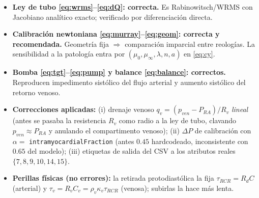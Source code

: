 \documentclass[11pt]{article}
\begin{document}
\begin{itemize}
\item \textbf{Ley de tubo \eqref{eq:wrms}--\eqref{eq:dQ}: correcta.} Es
  Rabinowitsch/WRMS con Jacobiano analítico exacto; verificado por
  diferenciación directa.
\item \textbf{Calibración newtoniana \eqref{eq:murray}--\eqref{eq:geom}:
  correcta y recomendada.} Geometría fija $\Rightarrow$ comparación imparcial
  entre reologías. La sensibilidad a la patología entra por $(\mu_0,\mu_\infty,
  \lambda,n,a)$ en \eqref{eq:cy}.
\item \textbf{Bomba \eqref{eq:tgt}--\eqref{eq:pump} y balance
  \eqref{eq:balance}: correctos.} Reproducen impedimento sistólico del flujo
  arterial y aumento sistólico del retorno venoso.
\item \textbf{Correcciones aplicadas:}
  (i) drenaje venoso $q_v=(p_{ven}-P_{RA})/R_v$ \emph{lineal} (antes se pasaba
  la resistencia $R_v$ como radio a la ley de tubo, clavando $p_{ven}\approx
  P_{RA}$ y anulando el compartimento venoso);
  (ii) $\Delta P$ de calibración con $\alpha=$ \texttt{intramyocardialFraction}
  (antes $0.45$ hardcodeado, inconsistente con $0.65$ del modelo);
  (iii) etiquetas de salida del CSV a los atributos reales $\{7,8,9,10,14,15\}$.
\item \textbf{Perillas físicas (no errores):} la retirada protodiastólica la
  fija $\tau_{RCR}=R_dC$ (arterial) y $\tau_v=R_vC_v=\rho_v\kappa_v\tau_{RCR}$
  (venosa); subirlas la hace más lenta.
\end{itemize}
\end{document}
